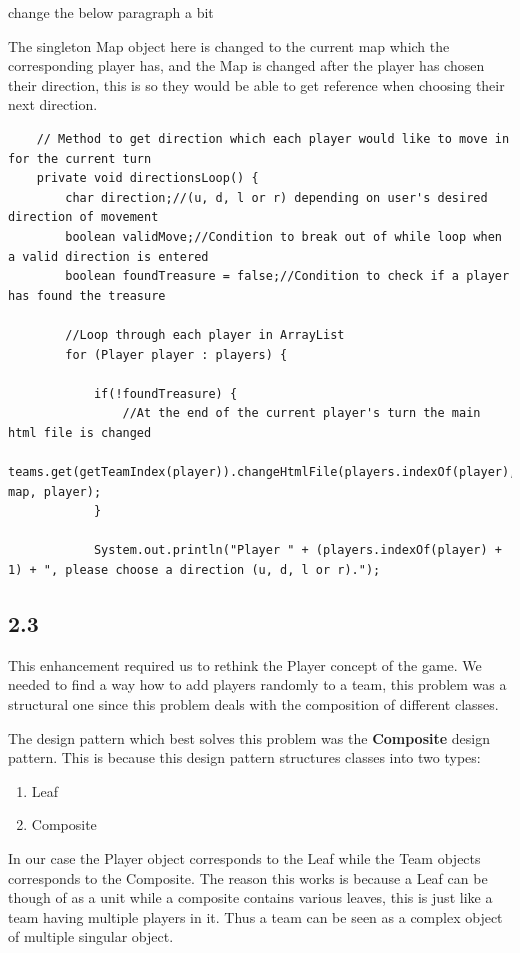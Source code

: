 \documentclass[a4paper,12pt]{extarticle}
\begin{document}
change the below paragraph a bit

The singleton Map object here is changed to the current map which the corresponding player has, and the Map is changed after the player has chosen their direction, this is so they would be able to get reference when choosing their next direction.

\begin{lstlisting}
    // Method to get direction which each player would like to move in for the current turn
    private void directionsLoop() {
        char direction;//(u, d, l or r) depending on user's desired direction of movement
        boolean validMove;//Condition to break out of while loop when a valid direction is entered
        boolean foundTreasure = false;//Condition to check if a player has found the treasure

        //Loop through each player in ArrayList
        for (Player player : players) {

            if(!foundTreasure) {
                //At the end of the current player's turn the main html file is changed
                teams.get(getTeamIndex(player)).changeHtmlFile(players.indexOf(player), map, player);
            }

            System.out.println("Player " + (players.indexOf(player) + 1) + ", please choose a direction (u, d, l or r).");
\end{lstlisting}

\subsection{2.3}
This enhancement required us to rethink the Player concept of the game. We needed to find a way how to add players randomly to a team, this problem was a structural one since this problem deals with the composition of different classes.

The design pattern which best solves this problem was the \textbf{Composite} design pattern. This is because this design pattern structures classes into two types:

\begin{enumerate}
\item Leaf
\item Composite
\end{enumerate}

In our case the Player object corresponds to the Leaf while the Team objects  corresponds to the Composite. The reason this works is because a Leaf can be though of as a unit while a composite contains various leaves, this is just like a team having multiple players in it. Thus a team can be seen as a complex object of multiple singular object. 
\end{document}

